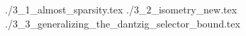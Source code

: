 \startchapter [title={Expected Error Analysis}]

 {./3_1_almost_sparsity.tex}
 {./3_2_isometry_new.tex}
 {./3_3_generalizing_the_dantzig_selector_bound.tex}

\stopchapter
